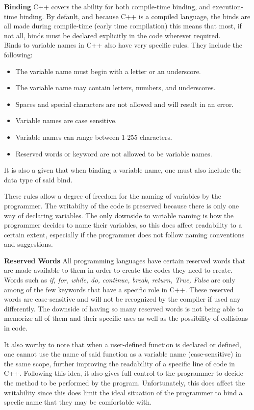 \documentclass[12pt]{article}
\begin{document}
\textbf{Binding} C++ covers the ability for both compile-time binding, and execution-time binding. By default, and because C++ is a compiled language, the binds are all made during compile-time (early time compilation) this means that most, if not all, binds must be declared explicitly in the code wherever required.\\ Binds to variable names in C++ also have very specific rules. They include the following:
\begin{itemize} \label{Variable name rules}
  \item The variable name must begin with a letter or an underscore.
  \item The variable name may contain letters, numbers, and underscores.
  \item Spaces and special characters are not allowed and will result in an error.
  \item Variable names are case sensitive.
  \item Variable names can range between 1-255 characters.
  \item Reserved words or keyword are not allowed to be variable names.
\end{itemize}
It is also a given that when binding a variable name, one must also include the data type of said bind.

These rules allow a degree of freedom for the naming of variables by the programmer. The writabilty of the code is preserved because there is only one way of declaring variables. The only downside to variable naming is how the programmer decides to name their variables, so this does affect readability to a certain extent, especially if the programmer does not follow naming conventions and suggestions.  

\textbf{Reserved Words} All programming languages have certain reserved words that are made available to them in order to create the codes they need to create. Words such as \textit{if, for, while, do, continue, break, return, True, False} are only among of the few keywords that have a specific role in C++. These reserved words are case-sensitive and will not be recognized by the compiler if used any differently. The downside of having so many reserved words is not being able to memorize all of them and their specific uses as well as the possibility of collisions in code. 

It also worthy to note that when a user-defined function is declared or defined, one cannot use the name of said function as a variable name (case-sensitive) in the same scope, further improving the readability of a specific line of code in C++. Following this idea, it also gives full control to the programmer to decide the method to be performed by the program. Unfortunately, this does affect the writability since this does limit the ideal situation of the programmer to bind a specfic name that they may be comfortable with. 
\end{document}
